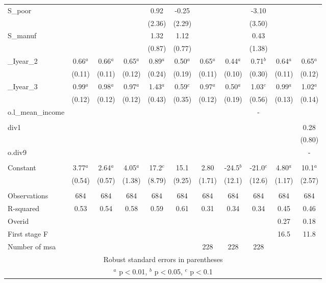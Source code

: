 \documentclass[]{article}
\begin{document}
\begin{tabular}{lcccccccccc}
S\_poor &  &  &  & 0.92 & -0.25 &  &  & -3.10 &  &  \\
 &  &  &  & (2.36) & (2.29) &  &  & (3.50) &  &  \\
S\_manuf &  &  &  & 1.32 & 1.12 &  &  & 0.43 &  &  \\
 &  &  &  & (0.87) & (0.77) &  &  & (1.38) &  &  \\
\_Iyear\_2 & 0.66$^a$ & 0.66$^a$ & 0.65$^a$ & 0.89$^a$ & 0.50$^a$ & 0.65$^a$ & 0.44$^a$ & 0.71$^b$ & 0.64$^a$ & 0.65$^a$ \\
 & (0.11) & (0.11) & (0.12) & (0.24) & (0.19) & (0.11) & (0.10) & (0.30) & (0.11) & (0.12) \\
\_Iyear\_3 & 0.99$^a$ & 0.98$^a$ & 0.97$^a$ & 1.43$^a$ & 0.59$^c$ & 0.97$^a$ & 0.50$^a$ & 1.03$^c$ & 0.99$^a$ & 1.02$^a$ \\
 & (0.12) & (0.12) & (0.12) & (0.43) & (0.35) & (0.12) & (0.19) & (0.56) & (0.13) & (0.14) \\
o.l\_mean\_income &  &  &  &  &  &  &  & - &  &  \\
 &  &  &  &  &  &  &  &  &  &  \\
div1 &  &  &  &  &  &  &  &  &  & 0.28 \\
 &  &  &  &  &  &  &  &  &  & (0.80) \\
o.div9 &  &  &  &  &  &  &  &  &  & - \\
 &  &  &  &  &  &  &  &  &  &  \\
Constant & 3.77$^a$ & 2.64$^a$ & 4.05$^a$ & 17.2$^c$ & 15.1 & 2.80 & -24.5$^b$ & -21.0$^c$ & 4.80$^a$ & 10.1$^a$ \\
 & (0.54) & (0.57) & (1.38) & (8.79) & (9.25) & (1.71) & (12.1) & (12.6) & (1.17) & (2.57) \\
 &  &  &  &  &  &  &  &  &  &  \\
Observations & 684 & 684 & 684 & 684 & 684 & 684 & 684 & 684 & 684 & 684 \\
R-squared & 0.53 & 0.54 & 0.58 & 0.59 & 0.61 & 0.31 & 0.34 & 0.34 & 0.45 & 0.46 \\
Overid &  &  &  &  &  &  &  &  & 0.27 & 0.18 \\
First stage F &  &  &  &  &  &  &  &  & 16.5 & 11.8 \\
 Number of msa &  &  &  &  &  & 228 & 228 & 228 &  &  \\ \hline
\multicolumn{11}{c}{ Robust standard errors in parentheses} \\
\multicolumn{11}{c}{ $^a$ p$<$0.01, $^b$ p$<$0.05, $^c$ p$<$0.1} \\
\end{tabular}
\end{document}
